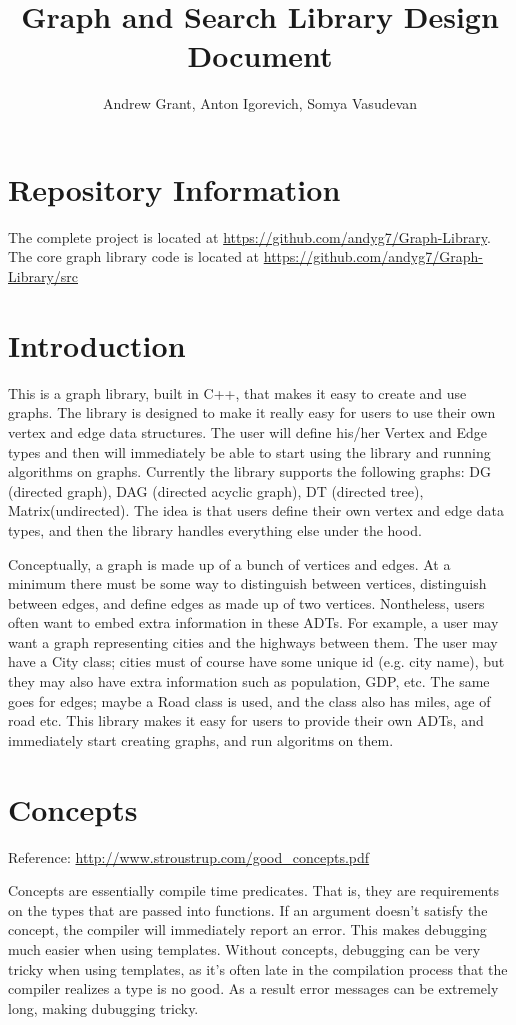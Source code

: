 \documentclass{article}
\title{Graph and Search Library Design Document}
\author{Andrew Grant,  Anton Igorevich, Somya Vasudevan}
\date{}
\begin{document}
\maketitle

\section{Repository Information}
The complete project is located at \url{https://github.com/andyg7/Graph-Library}.
The core graph library code is located at \url{https://github.com/andyg7/Graph-Library/src}

\section{Introduction}
This is a graph library, built in C++, that makes it easy to create and use graphs. The library is designed to make it really easy for users to use their own vertex and edge data structures. The user will define his/her Vertex and Edge types and then will immediately be able to start using the library and running algorithms on graphs. Currently the library supports the following graphs: DG (directed graph), DAG (directed acyclic graph), DT (directed tree), Matrix(undirected). The idea is that users define their own vertex and edge data types, and then the library handles everything else under the hood.

Conceptually, a graph is made up of a bunch of vertices and edges. At a minimum there must be some way to distinguish between vertices, distinguish between edges, and define edges as made up of two vertices. Nontheless, users often want to embed extra information in these ADTs. For example, a user may want a graph representing cities and the highways between them. The user may have a City class; cities must of course have some unique id (e.g. city name), but they may also have extra information such as population, GDP, etc. The same goes for edges; maybe a Road class is used, and the class also has miles, age of road etc. This library makes it easy for users to provide their own ADTs, and immediately start creating graphs, and run algoritms on them.

\section{Concepts}

Reference: \url{http://www.stroustrup.com/good_concepts.pdf}

Concepts are essentially compile time predicates. That is, they are requirements on the types that are passed into functions. If an argument doesn't satisfy the concept, the compiler will immediately report an error. This makes debugging much easier when using templates. Without concepts, debugging can be very tricky when using templates, as it's often late in the compilation process that the compiler realizes a type is no good. As a result error messages can be extremely long, making dubugging tricky. 
\end{document}
